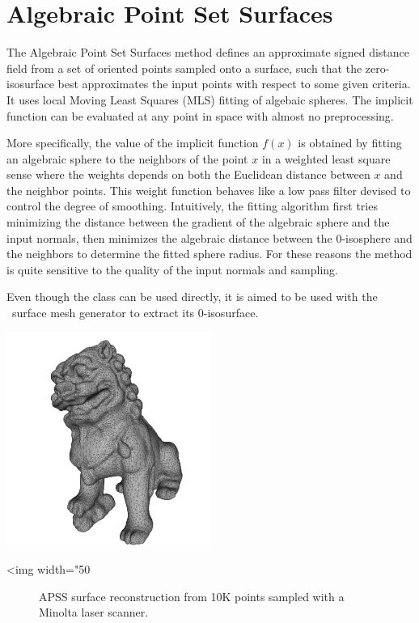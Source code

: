 
\section{Algebraic Point Set Surfaces}

The Algebraic Point Set Surfaces \cite{Guennebaud07} method defines an approximate signed distance field from a set of oriented points sampled onto a surface, such that the zero-isosurface best approximates the input points with respect to some given criteria.  It uses local Moving Least Squares (MLS) fitting of algebaic spheres. The implicit function can be evaluated at any point in space with almost no preprocessing.

More specifically, the value of the implicit function $f(x)$ is obtained by fitting an algebraic sphere to the neighbors of the point $x$ in a weighted least square sense where the weights depends on both the Euclidean distance between $x$ and the neighbor points. This weight function behaves like a low pass filter devised to control the degree of smoothing. Intuitively, the fitting algorithm first tries minimizing the distance between the gradient of the algebraic sphere and the input normals, then minimizes the algebraic distance between the 0-isosphere and the neighbors to determine the fitted sphere radius. For these reasons the method is quite sensitive to the quality of the input normals and sampling.

Even though the  class can be used directly, it is aimed to be used with the \cgal\ surface mesh generator to extract its $0$-isosurface.


\begin{center}
    \label{Surface_reconstruction_points_3-fig-APSS}
    \begin{ccTexOnly}
        \includegraphics[width=0.5\textwidth]{Surface_reconstruction_points_3/APSS} %
    \end{ccTexOnly}
    \begin{ccHtmlOnly}
        <img width="50%
    \end{ccHtmlOnly}
    \begin{figure}[h]
        \caption{APSS surface reconstruction from 10K
                 points sampled with a Minolta laser scanner.}
    \end{figure}
\end{center}

